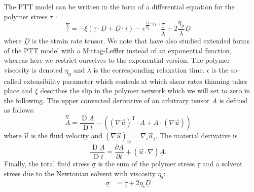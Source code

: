 \documentclass[a4paper,12pt]{scrartcl}
\newcommand{\ma}[1]{\underline{#1}}
\DeclareMathOperator{\Tr}{Tr}
\DeclareMathOperator{\Dif}{D}
\begin{document}
The PTT model can be written in the form of a differential equation for the polymer stress $\ma{\tau}$ \cite{ferras2019}:
	\begin{equation}
		\overset{\nabla}{\ma{\tau}} = -\xi\left(\ma{\tau}\cdot\ma{D} + \ma{D}\cdot\ma{\tau}\right) - e^{\frac{\epsilon\lambda}{\eta_\text{p}}\Tr\ma{\tau}}\frac{\ma{\tau}}{\lambda} + 2\frac{\eta_\text{p}}{\lambda}\ma{D}
		\label{eq:polymerStress}
	\end{equation}
where $\ma{D}$ is the strain rate tensor.
We note that \cite{ferras2019} have also studied extended forms of the PTT model with a Mittag-Leffler instead of an exponential function, whereas here we restrict ourselves to the exponential version.
The polymer viscosity is denoted $\eta_\text{p}$ and $\lambda$ is the corresponding relaxation time.
$\epsilon$ is the so-called extensibility parameter which controls at which shear rates thinning takes place and $\xi$ describes the slip in the polymer network which we will set to zero in the following.
The upper convected derivative of an arbitrary tensor $\ma{A}$ is defined as follows:
	\begin{equation}
		\overset{\nabla}{\ma{A}} = \frac{\Dif\ma{A}}{\Dif t} - \left(\left(\nabla\vec{u}\right)^\mathrm{T}\cdot\ma{A} + \ma{A}\cdot\left(\nabla\vec{u}\right)\right)
	\end{equation}
where $\vec{u}$ is the fluid velocity and $\left(\nabla\vec{u}\right)_{ij} = \nabla_i\vec{u}_j$.
The material derivative is
	\begin{equation}
		\frac{\Dif\ma{A}}{\Dif t} = \frac{\partial\ma{A}}{\partial t} + \left(\vec{u}\cdot\nabla\right)\ma{A}.
	\end{equation}
Finally, the total fluid stress $\ma{\sigma}$ is the sum of the polymer stress $\ma{\tau}$ and a solvent stress due to the Newtonian solvent with viscosity $\eta_\text{s}$:
	\begin{align}
		\ma{\sigma} &= \ma{\tau} + 2\eta_\text{s}\ma{D} 		\label{eq:totalStress}
	\end{align}
\end{document}
